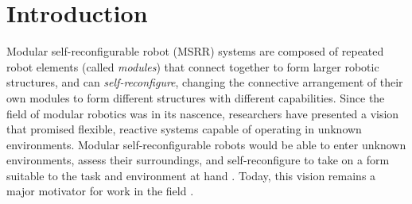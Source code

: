 \documentclass[12pt]{article}
\begin{document}
%

\section{Introduction}

Modular self-reconfigurable robot (MSRR) systems are composed of repeated robot elements (called \textit{modules}) that connect together to form larger robotic structures, and can \textit{self-reconfigure}, changing the connective arrangement of their own modules to form different structures with different capabilities.  Since the field of modular robotics was in its nascence, researchers have presented a vision that promised flexible, reactive systems capable of operating in unknown environments.  Modular self-reconfigurable robots would be able to enter unknown environments, assess their surroundings, and self-reconfigure to take on a form suitable to the task and environment at hand \cite{Yim1994}.  Today, this vision remains a major motivator for work in the field \cite{Yim2007a}.  
\end{document}
